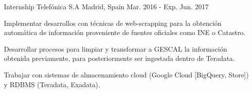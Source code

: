 \begin{cventries}
  \cventry
    {Internship} %
    {Telefónica S.A} %
    {Madrid, Spain} %
    {Mar. 2016 - Exp. Jun. 2017} %
    {
      \begin{cvitems} %
        \item {Implementar desarrollos con técnicas de web-scrapping para la obtención automática de información proveniente de fuentes oficiales como INE o Catastro.}
        \item {Desarrollar procesos para limpiar y transformar a GESCAL la información obtenida previamente, para posteriormente ser ingestada dentro de Teradata.}
        \item {Trabajar con sistemas de almacenamiento cloud (Google Cloud [BigQuery, Store]) y RDBMS (Teradata, Exadata).}
      \end{cvitems}
    }

\end{cventries}
